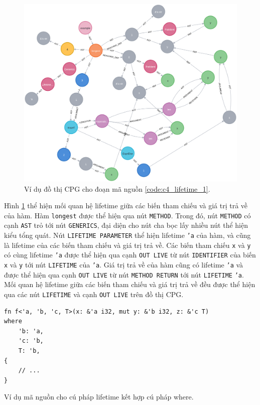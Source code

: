 \begin{figure}[H]
    \includegraphics[width=1\columnwidth]{figures/c4/c4_lifetime_1.png}
    \centering
    \caption{Ví dụ đồ thị CPG cho đoạn mã nguồn \ref{code:c4_lifetime_1}.}
    \label{img:c4_lifetime_1}
\end{figure}

Hình \ref{img:c4_lifetime_1} thể hiện mối quan hệ lifetime giữa các biến tham chiếu và giá trị trả về của hàm.
Hàm \texttt{longest} được thể hiện qua nút \texttt{METHOD}.
Trong đó, nút \texttt{METHOD} có cạnh \texttt{AST} trỏ tới nút \texttt{GENERICS}, đại diện cho nút cha bọc lấy nhiều nút thể hiện kiểu tổng quát.
Nút \texttt{LIFETIME PARAMETER} thể hiện lifetime \texttt{'a} của hàm, và cũng là lifetime của các biến tham chiếu và giá trị trả về.
Các biến tham chiếu \texttt{x} và \texttt{y} có cùng lifetime \texttt{'a} được thể hiện qua cạnh \texttt{OUT LIVE} từ nút \texttt{IDENTIFIER} của biến \texttt{x} và \texttt{y} tới nút \texttt{LIFETIME} của \texttt{'a}.
Giá trị trả về của hàm cũng có lifetime \texttt{'a} và được thể hiện qua cạnh \texttt{OUT LIVE} từ nút \texttt{METHOD RETURN} tới nút \texttt{LIFETIME} \texttt{'a}.
Mối quan hệ lifetime giữa các biến tham chiếu và giá trị trả về đều được thể hiện qua các nút \texttt{LIFETIME} và cạnh \texttt{OUT LIVE} trên đồ thị CPG.

\begin{listing}[H]
\begin{verbatim}
fn f<'a, 'b, 'c, T>(x: &'a i32, mut y: &'b i32, z: &'c T)
where
    'b: 'a,
    'c: 'b,
    T: 'b,
{
    // ...
}
\end{verbatim}
\caption{Ví dụ mã nguồn cho cú pháp lifetime kết hợp cú pháp where.}
\label{code:c4_lifetime_2}
\end{listing}


